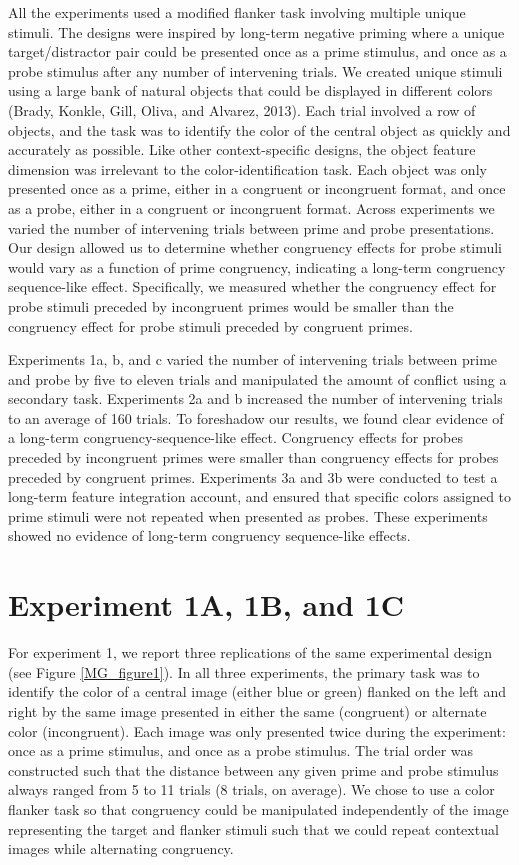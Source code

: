 \documentclass[]{DissertateCUNY}
\begin{document}
All the experiments used a modified flanker task involving multiple
unique stimuli. The designs were inspired by long-term negative priming
where a unique target/distractor pair could be presented once as a prime
stimulus, and once as a probe stimulus after any number of intervening
trials. We created unique stimuli using a large bank of natural objects
that could be displayed in different colors (Brady, Konkle, Gill, Oliva,
and Alvarez, 2013). Each trial involved a row of objects, and the task
was to identify the color of the central object as quickly and
accurately as possible. Like other context-specific designs, the object
feature dimension was irrelevant to the color-identification task. Each
object was only presented once as a prime, either in a congruent or
incongruent format, and once as a probe, either in a congruent or
incongruent format. Across experiments we varied the number of
intervening trials between prime and probe presentations. Our design
allowed us to determine whether congruency effects for probe stimuli
would vary as a function of prime congruency, indicating a long-term
congruency sequence-like effect. Specifically, we measured whether the
congruency effect for probe stimuli preceded by incongruent primes would
be smaller than the congruency effect for probe stimuli preceded by
congruent primes.

Experiments 1a, b, and c varied the number of intervening trials between
prime and probe by five to eleven trials and manipulated the amount of
conflict using a secondary task. Experiments 2a and b increased the
number of intervening trials to an average of 160 trials. To foreshadow
our results, we found clear evidence of a long-term
congruency-sequence-like effect. Congruency effects for probes preceded
by incongruent primes were smaller than congruency effects for probes
preceded by congruent primes. Experiments 3a and 3b were conducted to
test a long-term feature integration account, and ensured that specific
colors assigned to prime stimuli were not repeated when presented as
probes. These experiments showed no evidence of long-term congruency
sequence-like effects.

\hypertarget{experiment-1a-1b-and-1c}{%
\section{Experiment 1A, 1B, and 1C}\label{experiment-1a-1b-and-1c}}

For experiment 1, we report three replications of the same experimental
design (see Figure \ref{MG_figure1}). In all three experiments, the
primary task was to identify the color of a central image (either blue
or green) flanked on the left and right by the same image presented in
either the same (congruent) or alternate color (incongruent). Each image
was only presented twice during the experiment: once as a prime
stimulus, and once as a probe stimulus. The trial order was constructed
such that the distance between any given prime and probe stimulus always
ranged from 5 to 11 trials (8 trials, on average). We chose to use a
color flanker task so that congruency could be manipulated independently
of the image representing the target and flanker stimuli such that we
could repeat contextual images while alternating congruency.
\end{document}
